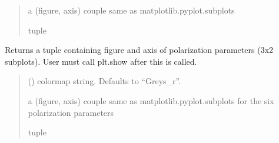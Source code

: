 \documentclass[letterpaper,10pt,english]{sphinxmanual}
\begin{document}
\begin{fulllineitems}
\begin{fulllineitems}
\begin{quote}
\begin{description}
\begin{itemize}
\end{itemize}

\sphinxAtStartPar
a (figure, axis) couple same as matplotlib.pyplot.subplots

\sphinxAtStartPar
tuple

\end{description}\end{quote}

\end{fulllineitems}


\begin{fulllineitems}
\label{\detokenize{micropolarray:micropolarray.micropol_image.MicropolImage.show_pol_params}}
\pysigstartsignatures
{}
\pysigstopsignatures
\sphinxAtStartPar
Returns a tuple containing figure and axis of polarization parameters (3x2 subplots). User must call plt.show after this is called.
\begin{quote}\begin{description}
\sphinxAtStartPar
{} (\sphinxstyleliteralemphasis{\sphinxupquote{, }}) \textendash{} colormap string. Defaults to “Greys\_r”.

\sphinxAtStartPar
a (figure, axis) couple same as
matplotlib.pyplot.subplots for the six polarization parameters

\sphinxAtStartPar
tuple

\end{description}\end{quote}

\end{fulllineitems}



\end{fulllineitems}
\end{document}
